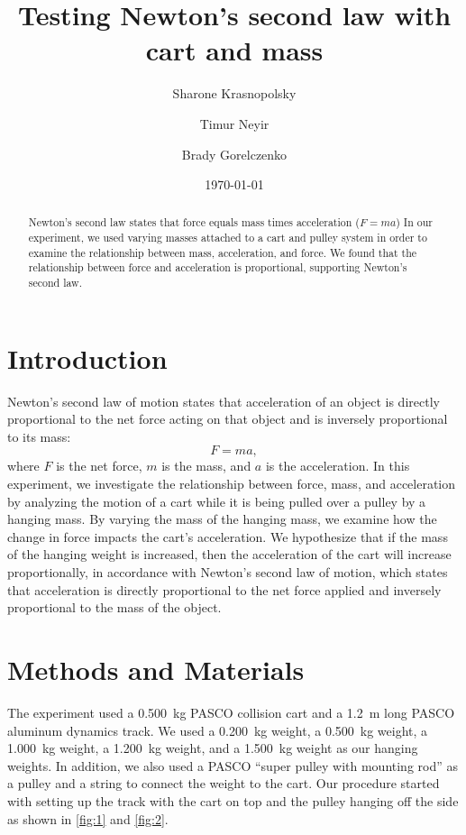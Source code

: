 ﻿\documentclass[reprint,amsmath,amssymb.aps]{revtex4-2}
\begin{document}
\title{Testing Newton's second law with cart and mass}
\author{Sharone Krasnopolsky}
\author{Timur Neyir}
\author{Brady Gorelczenko}
\date{\today}

\begin{abstract}
Newton’s second law states that force equals mass times acceleration ($F=ma$)
In our experiment, we used varying masses attached to a cart and pulley system in order to
examine the relationship between mass, acceleration, and force. We found that the relationship
between force and acceleration is proportional, supporting Newton’s second law.
\end{abstract}


\maketitle

\section{Introduction}
Newton’s second law of motion states that acceleration of an object is directly proportional to the net force acting on that object and is inversely proportional to its mass:
\begin{equation}
F = ma,
\end{equation}
where $F$ is the net force, $m$ is the mass, and $a$ is the acceleration. In this experiment, we investigate the relationship between force, mass, and acceleration by analyzing the motion of a cart while it is being pulled over a pulley by a hanging mass. By varying the mass of the hanging mass, we examine how the change in force impacts the cart’s acceleration. We hypothesize that if the mass of the hanging weight is increased, then the acceleration of the cart will increase proportionally, in accordance with Newton's second law of motion, which states that acceleration is directly proportional to the net force applied and inversely proportional to the mass of the object.






\section{Methods and Materials}
The experiment used a \qty{0.500}{\kilo\gram} PASCO collision cart and a \qty{1.2}{\meter} long PASCO aluminum dynamics track. We used a \qty{0.200}{\kilo\gram} weight, a \qty{0.500}{\kilo\gram} weight, a \qty{1.000}{\kilo\gram} weight, a \qty{1.200}{\kilo\gram} weight, and a \qty{1.500}{\kilo\gram} weight as our hanging weights. In addition, we also used a PASCO ``super 
pulley with mounting rod'' as a pulley and a string to connect the weight to the cart. Our procedure started with setting up the track with the cart on top and the pulley hanging off the side as shown in \cref{fig:1} and \cref{fig:2}.
\end{document}
